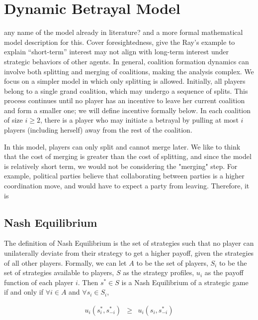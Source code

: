 \documentclass[sigconf,anonymous]{aamas}
\newcommand{\ykc}[1]{{\color{blue} #1}}
\begin{document}
\section{Dynamic Betrayal Model}

\ykc{any name of the model already in literature? and a more formal mathematical model description for this. Cover foresightedness, give the Ray's example to explain ``short-term'' interest may not align with long-term interest under strategic behaviors of other agents.}
In general, coalition formation dynamics can involve both splitting and merging of coalitions, making the analysis complex. We focus on a simpler model in which only splitting is allowed. Initially, all players belong to a single grand coalition, which may undergo a sequence of splits. This process continues until no player has an incentive to leave her current coalition and form a smaller one; we will define incentive formally below. In each coalition of size $i \geq 2$, there is a player who may initiate a betrayal by pulling at most $i$ players (including herself) away from the rest of the coalition.

In this model, players can only split and cannot merge later. We like to think that the cost of merging is greater than the cost of splitting, and since the model is relatively short term, we would not be considering the "merging" step. For example, political parties believe that collaborating between parties is a higher coordination move, and would have to expect a party from leaving. Therefore, it is 


\subsection{Nash Equilibrium}

The definition of Nash Equilibrium is the set of strategies such that no player can unilaterally deviate from their strategy to get a higher payoff, given the strategies of all other players. Formally, we can let $A$ to be the set of players, $S_i$ to be the set of strategies available to players, $S$ as the strategy profiles, $u_i$ as the payoff function of each player $i$. Then $s^*\in S$ is a Nash Equilibrium of a strategic game if and only if $\forall i \in A$ and $\forall s_i \in S_i$, 

\begin{eqnarray}
u_i(s^*_i, s_{-i}^*) & \geq & u_i(s_i, s_{-i}^*)
\end{eqnarray} 
\end{document}
